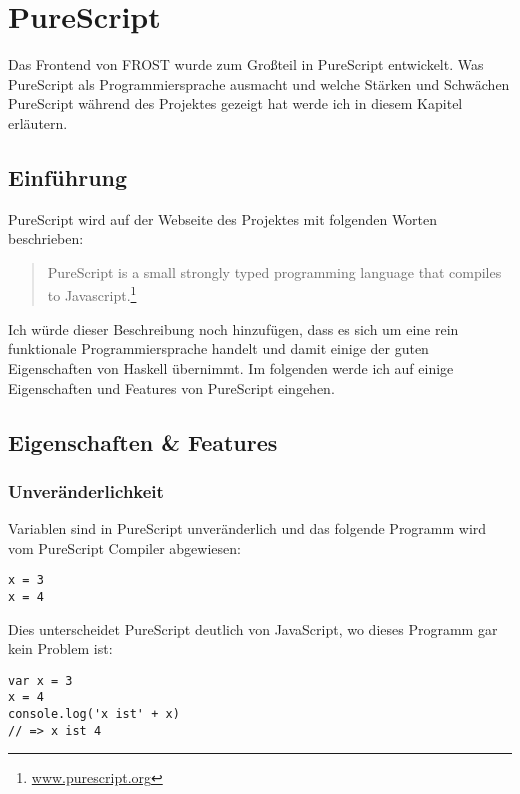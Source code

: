 \chapter{PureScript}
\label{cha:purescript}
Das Frontend von FROST wurde zum Großteil in PureScript entwickelt. Was
Pure\-Script als Programmiersprache ausmacht und welche Stärken und Schwächen
PureScript während des Projektes gezeigt hat werde ich in diesem Kapitel
erläutern.
\section{Einführung}
PureScript wird auf der Webseite des Projektes mit folgenden Worten beschrieben:
\begin{quote}
  PureScript is a small strongly typed programming language that compiles to
  Javascript.\footnote{\url{www.purescript.org}}
\end{quote}
Ich würde dieser Beschreibung noch hinzufügen, dass es sich um eine rein
funktionale Programmiersprache handelt und damit einige der guten Eigenschaften
von Haskell übernimmt. Im folgenden werde ich auf einige Eigenschaften und
Features von PureScript eingehen.


\section{Eigenschaften \& Features}

\subsection*{Unveränderlichkeit}
Variablen sind in PureScript unveränderlich und das folgende Programm wird vom
PureScript Compiler abgewiesen:
\begin{lstlisting}
x = 3
x = 4
\end{lstlisting}
Dies unterscheidet PureScript deutlich von JavaScript, wo dieses Programm gar
kein Problem ist:
\begin{lstlisting}
var x = 3
x = 4
console.log('x ist' + x)
// => x ist 4
\end{lstlisting}

